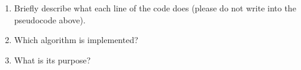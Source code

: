 \begin{center}
	\vspace*{-0.5cm}
	\begin{minipage}{0.8\textwidth}
		
	\end{minipage}
\end{center}
\begin{enumerate}
	\item Briefly describe what each line of the code does (please do not write into the pseudocode above).
	\item Which algorithm is implemented?
	\item What is its purpose?
\end{enumerate}

